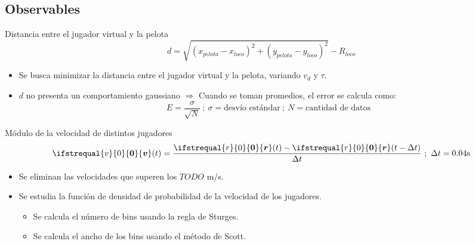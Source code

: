 \documentclass{beamer}
\renewcommand\vec[1]{\ifstrequal{#1}{0}{\ensuremath{\mathbf{0}}}{\ensuremath{\boldsymbol{#1}}}}
\begin{document}
        \subsection{Observables}

            \begin{frame}{Distancia entre el jugador virtual y la pelota}
                \begin{equation*}
                    d = \sqrt{(x_{pelota} - x_{loco})^2 + (y_{pelota} - y_{loco})^2} - R_{loco}
                \end{equation*}
                \begin{itemize}
                    \item Se busca minimizar la distancia entre el jugador virtual y la pelota, variando $v_d$ y $\tau$.
                    \item $d$ no presenta un comportamiento gaussiano $\Rightarrow$ Cuando se toman promedios, el error se calcula como:
                    \begin{equation*}
                        E = \frac{\sigma}{\sqrt{N}}\ ;\ \sigma = \text{desvío estándar}\ ;\ N = \text{cantidad de datos}
                    \end{equation*}
                \end{itemize}
            \end{frame}

            \begin{frame}{Módulo de la velocidad de distintos jugadores}
                \begin{equation*}
                    \vec{v}(t) = \frac{\vec{r}(t) - \vec{r}(t - \Delta t)}{\Delta t}\ ;\ \Delta t = 0.04 \text{s}
                \end{equation*}
                \begin{itemize}
                    \item Se eliminan las velocidades que superen los $TODO$ m/s.
                    \item Se estudia la función de densidad de probabilidad de la velocidad de los jugadores.
                    \begin{itemize}
                        \item Se calcula el número de bins usando la \alert{regla de Sturges}.
                        \item Se calcula el ancho de los bins usando el \alert{método de Scott}.
                    \end{itemize}
                \end{itemize}
            \end{frame}
\end{document}

